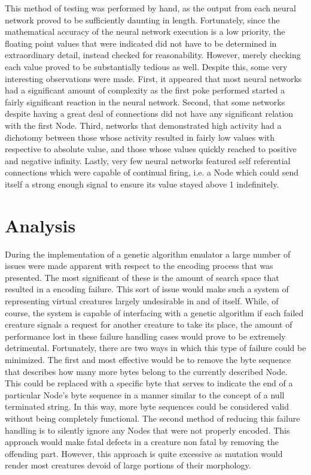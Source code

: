 \documentclass[12pt]{article}
\begin{document}
This method of testing was performed by hand, as the output from each neural network proved to be sufficiently daunting in length.
Fortunately, since the mathematical accuracy of the neural network execution is a low priority, the floating point values that were indicated did not have to be determined in extraordinary detail, instead checked for reasonability.
However, merely checking each value proved to be substantially tedious as well.
Despite this, some very interesting observations were made.
First, it appeared that most neural networks had a significant amount of complexity as the first poke performed started a fairly significant reaction in the neural network.
Second, that some networks despite having a great deal of connections did not have any significant relation with the first Node.
Third, networks that demonstrated high activity had a dichotomy between those whose activity resulted in fairly low values with respective to absolute value, and those whose values quickly reached to positive and negative infinity.
Lastly, very few neural networks featured self referential connections which were capable of continual firing, i.e. a Node which could send itself a strong enough signal to ensure its value stayed above 1 indefinitely.

\section*{Analysis}

During the implementation of a genetic algorithm emulator a large number of issues were made apparent with respect to the encoding process that was presented.
The most significant of these is the amount of search space that resulted in a encoding failure.
This sort of issue would make such a system of representing virtual creatures largely undesirable in and of itself.
While, of course, the system is capable of interfacing with a genetic algorithm if each failed creature signals a request for another creature to take its place, the amount of performance lost in these failure handling cases would prove to be extremely detrimental.
Fortunately, there are two ways in which this type of failure could be minimized.
The first and most effective would be to remove the byte sequence that describes how many more bytes belong to the currently described Node.
This could be replaced with a specific byte that serves to indicate the end of a particular Node’s byte sequence in a manner similar to the concept of a null terminated string.
In this way, more byte sequences could be considered valid without being completely functional.
The second method of reducing this failure handling is to silently ignore any Nodes that were not properly encoded.
This approach would make fatal defects in a creature non fatal by removing the offending part.
However, this approach is quite excessive as mutation would render most creatures devoid of large portions of their morphology.
\end{document}

